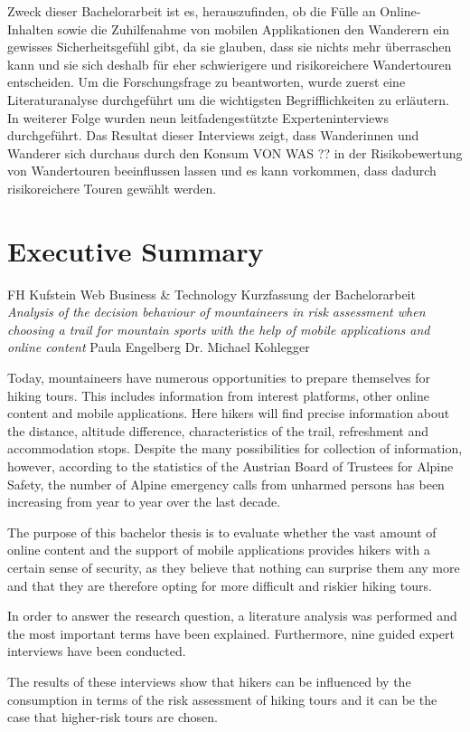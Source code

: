 Zweck dieser Bachelorarbeit ist es, herauszufinden, ob die Fülle an Online-Inhalten sowie die Zuhilfenahme von mobilen Applikationen den Wanderern ein gewisses Sicherheitsgefühl gibt, da sie glauben, dass sie nichts mehr überraschen kann und sie sich deshalb für eher schwierigere und risikoreichere Wandertouren entscheiden. Um die Forschungsfrage zu beantworten, wurde zuerst eine Literaturanalyse durchgeführt um die wichtigsten Begrifflichkeiten zu erläutern. In weiterer Folge wurden neun leitfadengestützte Experteninterviews durchgeführt. Das Resultat dieser Interviews zeigt, dass Wanderinnen und Wanderer sich durchaus durch den Konsum VON WAS ?? in der Risikobewertung von Wandertouren beeinflussen lassen und es kann vorkommen, dass dadurch risikoreichere Touren gewählt werden.




\chapter*{Executive Summary}

FH Kufstein\newline
Web Business \& Technology\newline
Kurzfassung der Bachelorarbeit \textit{Analysis of the decision behaviour of mountaineers in risk assessment when choosing a trail for mountain sports with the help of mobile applications and online content}\newline
Paula Engelberg\newline
Dr. Michael Kohlegger

Today, mountaineers have numerous opportunities to prepare themselves for hiking tours. This includes information from interest platforms, other online content and mobile applications. Here hikers will find precise information about the distance, altitude difference, characteristics of the trail, refreshment and accommodation stops. Despite the many possibilities for collection of information, however, according to the statistics of the Austrian Board of Trustees for Alpine Safety, the number of Alpine emergency calls from unharmed persons has been increasing from year to year over the last decade.

The purpose of this bachelor thesis is to evaluate whether the vast amount of online content and the support of mobile applications provides hikers with a certain sense of security, as they believe that nothing can surprise them any more and that they are therefore opting for more difficult and riskier hiking tours. 

In order to answer the research question, a literature analysis was performed and the most important terms have been explained. Furthermore, nine guided expert interviews have been conducted. 

The results of these interviews show that hikers can be influenced by the consumption in terms of the risk assessment of hiking tours and it can be the case that higher-risk tours are chosen.



